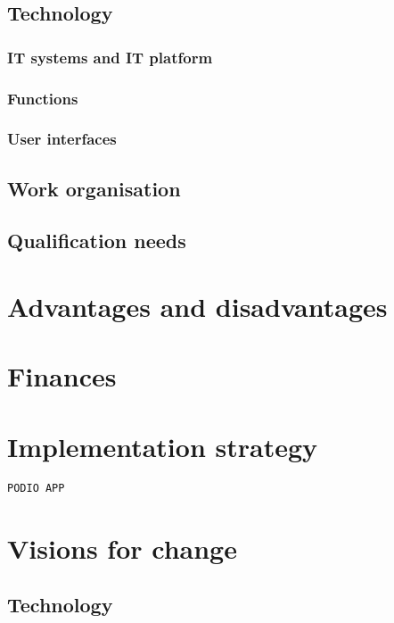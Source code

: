 \subsection{Technology}

\subsubsection{IT systems and IT platform}

\subsubsection{Functions}

\subsubsection{User interfaces}

\subsection{Work organisation}
\label{sub:work_organisation}

\subsection{Qualification needs}
\label{sub:qualification_needs}

\section{Advantages and disadvantages}

\section{Finances}

\section{Implementation strategy}

\texttt{PODIO APP}
\section{Visions for change}

\subsection{Technology}
\label{sub:technology}

